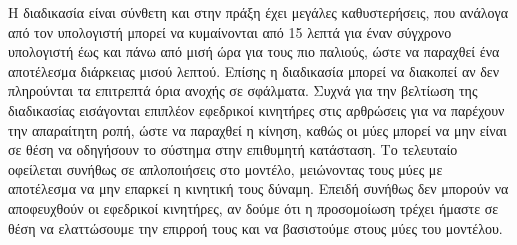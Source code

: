 Η διαδικασία είναι σύνθετη και στην πράξη έχει μεγάλες καθυστερήσεις, που ανάλογα από τον υπολογιστή μπορεί να κυμαίνονται από 15 λεπτά για έναν σύγχρονο υπολογιστή έως και πάνω από μισή ώρα για τους πιο παλιούς, ώστε να παραχθεί ένα αποτέλεσμα διάρκειας μισού λεπτού. Επίσης η διαδικασία μπορεί να διακοπεί αν δεν πληρούνται τα επιτρεπτά όρια ανοχής σε σφάλματα. Συχνά για την βελτίωση της διαδικασίας εισάγονται επιπλέον εφεδρικοί κινητήρες στις αρθρώσεις για να παρέχουν την απαραίτητη ροπή, ώστε να παραχθεί η κίνηση, καθώς οι μύες μπορεί να μην είναι σε θέση να οδηγήσουν το σύστημα στην επιθυμητή κατάσταση. Το τελευταίο οφείλεται συνήθως σε απλοποιήσεις στο μοντέλο, μειώνοντας τους μύες με αποτέλεσμα να μην επαρκεί η κινητική τους δύναμη. Επειδή συνήθως δεν μπορούν να αποφευχθούν οι εφεδρικοί κινητήρες, αν δούμε ότι η προσομοίωση τρέχει ήμαστε σε θέση να ελαττώσουμε την επιρροή τους και να βασιστούμε στους μύες του μοντέλου.



